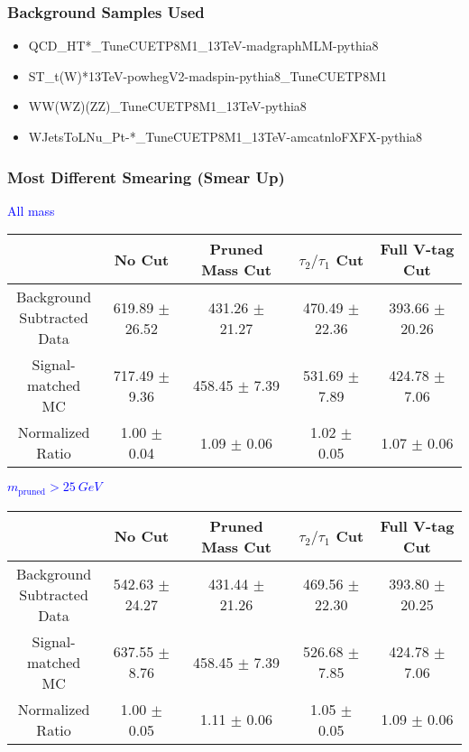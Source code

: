 \documentclass{beamer}
\begin{document}
\begin{frame}
  \frametitle{Background Samples Used}
  \begin{itemize}
  \item QCD\_HT*\_TuneCUETP8M1\_13TeV-madgraphMLM-pythia8
  \item ST\_t(W)*13TeV-powhegV2-madspin-pythia8\_TuneCUETP8M1
  \item WW(WZ)(ZZ)\_TuneCUETP8M1\_13TeV-pythia8
  \item WJetsToLNu\_Pt-*\_TuneCUETP8M1\_13TeV-amcatnloFXFX-pythia8
  \end{itemize}
\end{frame}

\begin{frame}
  \frametitle{Most Different Smearing (Smear Up)}
  \begin{adjustwidth}{-1.5em}{-1.5em}
    \centering
    \vspace{6pt}
    \textcolor{blue}{All mass}
    \vspace{6pt}

    {\scriptsize
      \begin{tabular}{c | c | c | c | c}
\hline
 & No Cut & Pruned Mass Cut & $\tau_2/\tau_1$ Cut & Full V-tag Cut \\
\hline
\makecell{Background \\ Subtracted \\ Data} & 619.89 $\pm$ 26.52 & 431.26 $\pm$ 21.27 & 470.49 $\pm$ 22.36 & 393.66 $\pm$ 20.26 \\
\makecell{Signal-\\ matched MC} & 717.49 $\pm$ 9.36 & 458.45 $\pm$ 7.39 & 531.69 $\pm$ 7.89 & 424.78 $\pm$ 7.06 \\
\hline
\makecell{Normalized \\ Ratio} & 1.00 $\pm$ 0.04 & 1.09 $\pm$ 0.06 & 1.02 $\pm$ 0.05 & 1.07 $\pm$ 0.06 \\
\hline
      \end{tabular}
    }

    \vspace{6pt}
    \textcolor{blue}{$m_\text{pruned} > \SI{25}{GeV}$}
    \vspace{6pt}

    {\scriptsize
      \begin{tabular}{c | c | c | c | c}
\hline
 & No Cut & Pruned Mass Cut & $\tau_2/\tau_1$ Cut & Full V-tag Cut \\
\hline
\makecell{Background \\ Subtracted \\ Data} & 542.63 $\pm$ 24.27 & 431.44 $\pm$ 21.26 & 469.56 $\pm$ 22.30 & 393.80 $\pm$ 20.25 \\
\makecell{Signal-\\ matched MC} & 637.55 $\pm$ 8.76 & 458.45 $\pm$ 7.39 & 526.68 $\pm$ 7.85 & 424.78 $\pm$ 7.06 \\
\hline
\makecell{Normalized \\ Ratio} & 1.00 $\pm$ 0.05 & 1.11 $\pm$ 0.06 & 1.05 $\pm$ 0.05 & 1.09 $\pm$ 0.06 \\
\hline
      \end{tabular}
    }
  \end{adjustwidth}
\end{frame}
\end{document}
